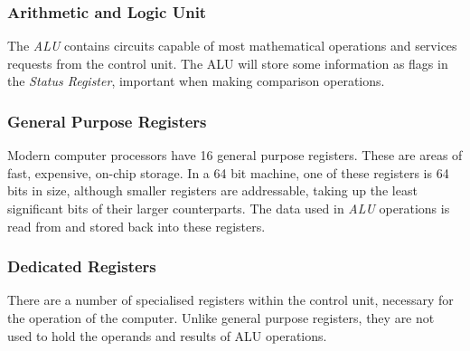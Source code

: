 \documentclass[9pt]{article}
\begin{document}
\subsubsection{Arithmetic and Logic Unit}
\label{sec:org4d09afc}

The \emph{ALU} contains circuits capable of most mathematical operations and services requests from the control unit. The ALU will store some information as flags in the \emph{Status Register}, important when making comparison operations.

\subsubsection{General Purpose Registers}
\label{sec:orgada22f0}

Modern computer processors have 16 general purpose registers. These are areas of fast, expensive, on-chip storage. In a 64 bit machine, one of these registers is 64 bits in size, although smaller registers are addressable, taking up the least significant bits of their larger counterparts. The data used in \emph{ALU} operations is read from and stored back into these registers.

\subsubsection{Dedicated Registers}
\label{sec:org9d63be1}

There are a number of specialised registers within the control unit, necessary for the operation of the computer. Unlike general purpose registers, they are not used to hold the operands and results of ALU operations.
\end{document}
